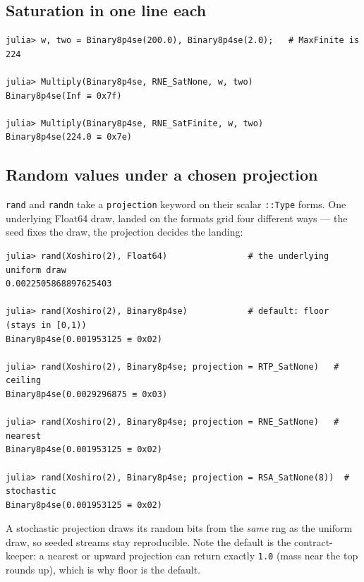 \subsection{Saturation in one line each}



\label{18285742174011812433}{}



\begin{verbatim}
julia> w, two = Binary8p4se(200.0), Binary8p4se(2.0);   # MaxFinite is 224

julia> Multiply(Binary8p4se, RNE_SatNone, w, two)
Binary8p4se(Inf ≡ 0x7f)

julia> Multiply(Binary8p4se, RNE_SatFinite, w, two)
Binary8p4se(224.0 ≡ 0x7e)
\end{verbatim}



\subsection{Random values under a chosen projection}



\label{10520373459060902538}{}


\texttt{rand} and \texttt{randn} take a \texttt{projection} keyword on their scalar \texttt{::Type} forms. One underlying Float64 draw, landed on the format{\textquotesingle}s grid four different ways — the seed fixes the draw, the projection decides the landing:




\begin{verbatim}
julia> rand(Xoshiro(2), Float64)                # the underlying uniform draw
0.0022505868897625403

julia> rand(Xoshiro(2), Binary8p4se)            # default: floor (stays in [0,1))
Binary8p4se(0.001953125 ≡ 0x02)

julia> rand(Xoshiro(2), Binary8p4se; projection = RTP_SatNone)   # ceiling
Binary8p4se(0.0029296875 ≡ 0x03)

julia> rand(Xoshiro(2), Binary8p4se; projection = RNE_SatNone)   # nearest
Binary8p4se(0.001953125 ≡ 0x02)

julia> rand(Xoshiro(2), Binary8p4se; projection = RSA_SatNone(8))  # stochastic
Binary8p4se(0.001953125 ≡ 0x02)
\end{verbatim}



A stochastic projection draws its random bits from the \emph{same} rng as the uniform draw, so seeded streams stay reproducible. Note the default is the contract-keeper: a nearest or upward projection can return exactly \texttt{1.0} (mass near the top rounds up), which is why floor is the default.



